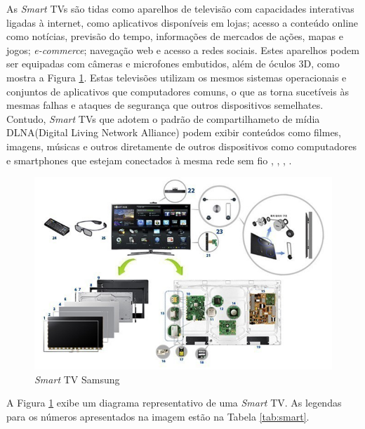 
As \emph{Smart} TVs são tidas como aparelhos de televisão com capacidades interativas ligadas à internet, como aplicativos disponíveis em lojas; acesso a conteúdo online como notícias, previsão do tempo, informações de mercados de ações, mapas e jogos; \emph{e-commerce}; navegação web e acesso a redes sociais. Estes aparelhos podem ser equipadas com câmeras e microfones embutidos, além de óculos 3D, como mostra a Figura \ref{fig:smart_samsung}. Estas televisões utilizam os mesmos sistemas operacionais e conjuntos de aplicativos que computadores comuns, o que as torna sucetíveis às mesmas falhas e ataques de segurança que outros dispositivos semelhates. Contudo, \emph{Smart} TVs que adotem o padrão de compartilhameto de mídia DLNA(Digital Living Network Alliance) podem exibir conteúdos como filmes, imagens, músicas e outros diretamente de outros dispositivos como computadores e smartphones que estejam conectados à mesma rede sem fio \cite{michele2014watch}, \cite{shin2013smart}, \cite{perakakis2015proposed}, \cite{whatisasmarttv}.
\begin{figure}
	\includegraphics[width=\textwidth]{img/smart_samsung.jpg}
	\caption{\emph{Smart} TV Samsung \cite{samsung:smarttv}}
	\label{fig:smart_samsung}
\end{figure}

A Figura \ref{fig:smart_samsung} exibe um diagrama representativo de uma \emph{Smart} TV. As legendas para os números apresentados na imagem estão na Tabela \ref{tab:smart}.

